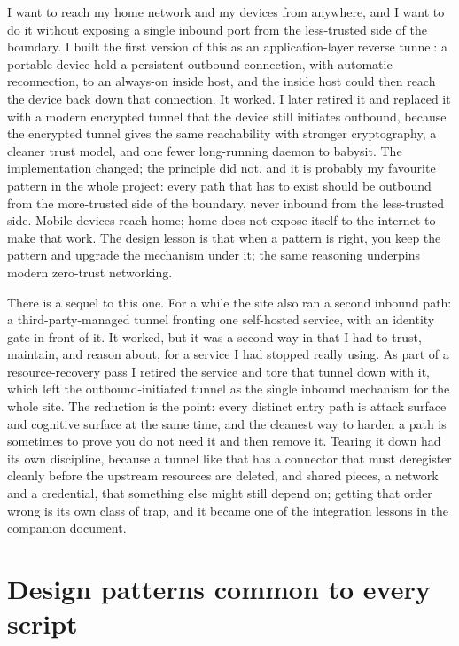 \documentclass[12pt]{article}
\begin{document}
I want to reach my home network and my devices from anywhere, and I want to do it without exposing a single inbound port from the less-trusted side of the boundary. I built the first version of this as an application-layer reverse tunnel: a portable device held a persistent outbound connection, with automatic reconnection, to an always-on inside host, and the inside host could then reach the device back down that connection. It worked. I later retired it and replaced it with a modern encrypted tunnel that the device still initiates outbound, because the encrypted tunnel gives the same reachability with stronger cryptography, a cleaner trust model, and one fewer long-running daemon to babysit. The implementation changed; the principle did not, and it is probably my favourite pattern in the whole project: every path that has to exist should be outbound from the more-trusted side of the boundary, never inbound from the less-trusted side. Mobile devices reach home; home does not expose itself to the internet to make that work. The design lesson is that when a pattern is right, you keep the pattern and upgrade the mechanism under it; the same reasoning underpins modern zero-trust networking.

There is a sequel to this one. For a while the site also ran a second inbound path: a third-party-managed tunnel fronting one self-hosted service, with an identity gate in front of it. It worked, but it was a second way in that I had to trust, maintain, and reason about, for a service I had stopped really using. As part of a resource-recovery pass I retired the service and tore that tunnel down with it, which left the outbound-initiated tunnel as the single inbound mechanism for the whole site. The reduction is the point: every distinct entry path is attack surface and cognitive surface at the same time, and the cleanest way to harden a path is sometimes to prove you do not need it and then remove it. Tearing it down had its own discipline, because a tunnel like that has a connector that must deregister cleanly before the upstream resources are deleted, and shared pieces, a network and a credential, that something else might still depend on; getting that order wrong is its own class of trap, and it became one of the integration lessons in the companion document.

\section{Design patterns common to every script}
\end{document}
